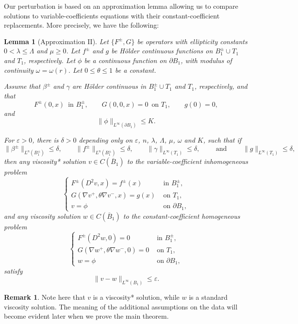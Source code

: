 \documentclass[letter,11pt]{amsart}
\newcommand{\vep}{\varepsilon}
\newtheorem{lem}[thm]{Lemma}
\theoremstyle{definition}
\newtheorem{rem}[thm]{Remark}
\numberwithin{equation}{section}
\begin{document}
\medskip

Our perturbation is based on an approximation lemma allowing us to compare solutions to variable-coefficients equations with their constant-coefficient replacements.
More precisely, we have the following:

\begin{lem}
[Approximation II]
\label{lem:approx}
Let $\{F^{\pm}, G\}$ be operators with ellipticity constants $0 < \lambda \leq \Lambda$ and $\mu \geq 0$.
Let $f^{\pm}$ and $g$ be H\"{o}lder continuous functions on $B_1^{\pm} \cup T_1$ and $T_1$, respectively.
Let $\phi$ be a continuous function on $\partial B_1$, with modulus of continuity $\omega = \omega(r)$.
Let $0 \leq \theta \leq 1$ be a constant.

Assume that $\beta^{\pm}$ and $\gamma$ are H\"{o}lder continuous in $B_1^{\pm} \cup T_1$ and $T_1$, respectively, and that
\[
F^{\pm}(0,x) \, \text{ in } B_1^{\pm}, \qquad G(0,0,x) = 0 \, \text{ on } T_1, \qquad g(0) = 0,
\]
and
\[
\|\phi\|_{L^{\infty}(\partial B_1)} \leq K.
\]

For $\vep > 0$, there is $\delta >0$ depending only on $\vep$, $n$, $\lambda$, $\Lambda$, $\mu$, $\omega$ and $K$, such that if 
\[
\|\beta^{\pm}\|_{L^n(B^{\pm}_1)} \leq \delta, 
\qquad \|f^{\pm}\|_{L^n(B^{\pm}_1)} \leq \delta, 
\qquad \|\gamma\|_{L^{\infty}(T_1)} \leq \delta,
\qquad \text{ and }
\qquad \|g\|_{L^{\infty}(T_1)} \leq \delta, 
\]
then any viscosity* solution $v \in C(\overline{B}_1)$ to the variable-coefficient inhomogeneous problem
\[
\begin{cases}
F^{\pm}(D^2 v, x) = f^{\pm}(x) & \text{ in } B_1^{\pm},\\
G(\nabla v^{+}, \theta \nabla v^{-},x) = g(x) & \text{ on } T_1,\\ 
v = \phi & \text{ on } \partial B_1,
\end{cases}
\]
and any viscosity solution $w \in C(\overline{B}_1)$ to the constant-coefficient homogeneous problem
\[
\begin{cases}
F^{\pm}(D^2 w, 0) = 0 & \text{ in } B_1^{\pm},\\
G(\nabla w^{+}, \theta \nabla w^{-}, 0) = 0 & \text{ on } T_1,\\ 
w = \phi & \text{ on } \partial B_1,
\end{cases}
\]
satisfy
\[
\|v - w\|_{L^{\infty}(B_1)} \leq \vep.
\]
\end{lem}

\begin{rem}
Note here that $v$ is a viscosity* solution, while $w$ is a standard viscosity solution.
The meaning of the additional assumptions on the data will become evident later when we prove the main theorem.
\end{rem}
\end{document}
